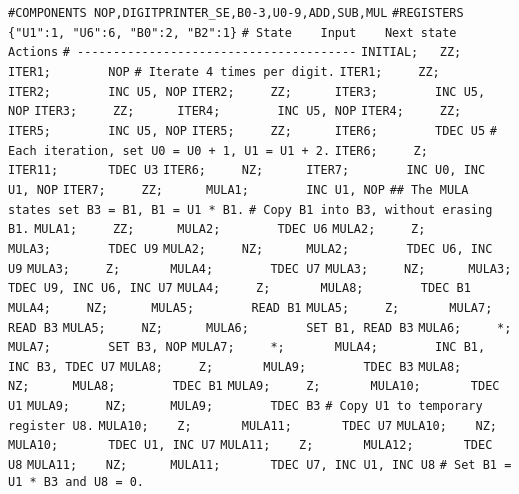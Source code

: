 \begin{apgsembly}
	\centering
	\begin{minipage}[t]{.49\textwidth}
		\begin{algorithmic}\tiny
			\State \verb|#COMPONENTS NOP,DIGITPRINTER_SE,B0-3,U0-9,ADD,SUB,MUL|
			\State \verb|#REGISTERS {"U1":1, "U6":6, "B0":2, "B2":1}|
			\State \verb|# State    Input    Next state    Actions|
			\State \verb|# ---------------------------------------|
			\State \verb|INITIAL;   ZZ;      ITER1;        NOP|
			\State \verb||
			\State \verb|# Iterate 4 times per digit.|
			\State \verb|ITER1;     ZZ;      ITER2;        INC U5, NOP|
			\State \verb|ITER2;     ZZ;      ITER3;        INC U5, NOP|
			\State \verb|ITER3;     ZZ;      ITER4;        INC U5, NOP|
			\State \verb|ITER4;     ZZ;      ITER5;        INC U5, NOP|
			\State \verb|ITER5;     ZZ;      ITER6;        TDEC U5|
			\State \verb||
			\State \verb|# Each iteration, set U0 = U0 + 1, U1 = U1 + 2.|
			\State \verb|ITER6;     Z;       ITER11;       TDEC U3|
			\State \verb|ITER6;     NZ;      ITER7;        INC U0, INC U1, NOP|
			\State \verb|ITER7;     ZZ;      MULA1;        INC U1, NOP|
			\State \verb||
			\State \verb|## The MULA states set B3 = B1, B1 = U1 * B1.|
			\State \verb|# Copy B1 into B3, without erasing B1.|
			\State \verb|MULA1;     ZZ;      MULA2;        TDEC U6|
			\State \verb|MULA2;     Z;       MULA3;        TDEC U9|
			\State \verb|MULA2;     NZ;      MULA2;        TDEC U6, INC U9|
			\State \verb|MULA3;     Z;       MULA4;        TDEC U7|
			\State \verb|MULA3;     NZ;      MULA3;        TDEC U9, INC U6, INC U7|
			\State \verb|MULA4;     Z;       MULA8;        TDEC B1|
			\State \verb|MULA4;     NZ;      MULA5;        READ B1|
			\State \verb|MULA5;     Z;       MULA7;        READ B3|
			\State \verb|MULA5;     NZ;      MULA6;        SET B1, READ B3|
			\State \verb|MULA6;     *;       MULA7;        SET B3, NOP|
			\State \verb|MULA7;     *;       MULA4;        INC B1, INC B3, TDEC U7|
			\State \verb|MULA8;     Z;       MULA9;        TDEC B3|
			\State \verb|MULA8;     NZ;      MULA8;        TDEC B1|
			\State \verb|MULA9;     Z;       MULA10;       TDEC U1|
			\State \verb|MULA9;     NZ;      MULA9;        TDEC B3|
			\State \verb||
			\State \verb|# Copy U1 to temporary register U8.|
			\State \verb|MULA10;    Z;       MULA11;       TDEC U7|
			\State \verb|MULA10;    NZ;      MULA10;       TDEC U1, INC U7|
			\State \verb|MULA11;    Z;       MULA12;       TDEC U8|
			\State \verb|MULA11;    NZ;      MULA11;       TDEC U7, INC U1, INC U8|
			\State \verb||
			\State \verb|# Set B1 = U1 * B3 and U8 = 0.|

\end{algorithmic}
\end{minipage}
\end{apgsembly}
